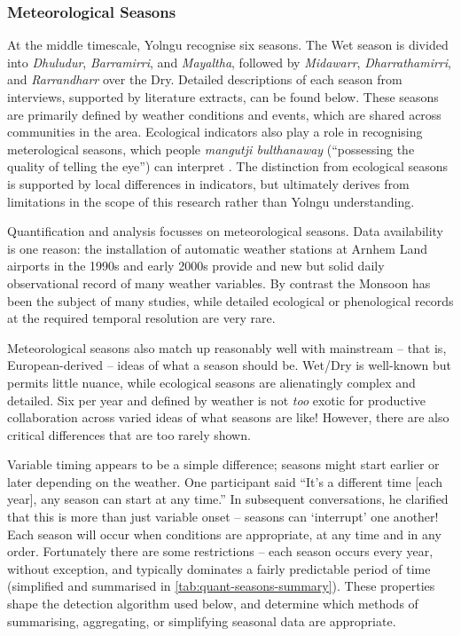 \subsubsection{Meteorological Seasons}

At the middle timescale, Yolngu recognise six seasons.
The Wet season is divided into \textit{Dhuludur}, \textit{Barramirri},
and \textit{Mayaltha}, followed by \textit{Midawarr}, \textit{Dharrathamirri},
and \textit{Rarrandharr} over the Dry.  Detailed descriptions of each
season from interviews, supported by literature extracts, can be found below.
%
These seasons are primarily defined by weather conditions and events,
which are shared across communities in the area.  Ecological indicators
also play a role in recognising meterological seasons, which people
\textit{mangutji bulthanaway} (``possessing the quality of telling the eye'')
can interpret \citep[p35]{atlas2014}.  The distinction from ecological
seasons is supported by local differences in indicators, but ultimately
derives from limitations in the scope of this research rather than
Yolngu understanding.

Quantification and analysis focusses on meteorological seasons.
Data availability is one reason:  the installation of automatic weather
stations at Arnhem Land airports in the 1990s and early 2000s provide
and new but solid daily observational record of many weather variables.
By contrast the Monsoon has been the subject of many studies, while
detailed ecological or phenological records at the required temporal
resolution are very rare.


Meteorological seasons also match up reasonably well with mainstream --
that is, European-derived -- ideas of what a season should be.  Wet/Dry
is well-known but permits little nuance, while ecological seasons are
alienatingly complex and detailed.  Six per year and defined by weather
is not \emph{too} exotic for productive collaboration across varied
ideas of what seasons are like!  However, there are also critical
differences that are too rarely shown.

Variable timing appears to be a simple difference; seasons might start
earlier or later depending on the weather.  One participant said
``It's a different time [each year], any season can start at any time.''
In subsequent conversations, he clarified that this is more than just
variable onset -- seasons can `interrupt' one another!  Each season will
occur when conditions are appropriate, at any time and in any order.
%
Fortunately there are some restrictions -- each season occurs every year,
without exception, and typically dominates a fairly predictable period
of time (simplified and summarised in \cref{tab:quant-seasons-summary}).
These properties shape the detection algorithm used below, and determine
which methods of summarising, aggregating, or simplifying seasonal data
are appropriate.



